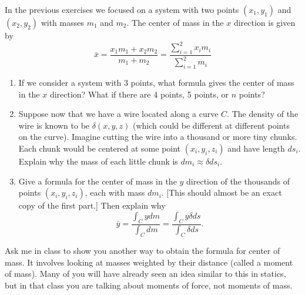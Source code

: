 \begin{problem}\label{center of mass of curve}%
%
In the previous exercises we focused on a system with two points $(x_1,y_1)$ and $(x_2,y_2)$ with masses $m_1$ and $m_2$. The center of mass in the $x$ direction is given by  
$$
\bar x = \frac{x_1m_1+x_2m_2}{m_1+m_2} = \frac{\sum_{i=1}^2x_i m_i}{\sum_{i=1}^2m_i}$$
\begin{enumerate}
\item If we consider a system with 3 points, what formula gives the center of mass in the $x$ direction? What if there are 4 points, 5 points, or $n$ points?  
 \item Suppose now that we have a wire located along a curve $C$. The density of the wire is known to be $\delta(x,y,z)$ (which could be different at different points on the curve).  Imagine cutting the wire into a thousand or more tiny chunks.  Each chunk would be centered at some point $(x_i,y_i,z_i)$ and have length $ds_i$. Explain why the mass of each little chunk is $dm_i\approx\delta ds_i$. 
 \item Give a formula for the center of mass in the $y$ direction of the thousands of points $(x_i,y_i,z_i)$, each with mass $dm_i$. [This should almost be an exact copy of the first part.] 
 Then explain why $$\bar y = \frac{\int_C y dm}{\int_C dm}=\frac{\int_C y \delta ds}{\int_C \delta ds}.$$
\end{enumerate}
\end{problem}

Ask me in class to show you another way to obtain the formula for center of mass. It involves looking at masses weighted by their distance (called a moment of mass).  Many of you will have already seen an idea similar to this in statics, but in that class you are talking about moments of force, not moments of mass. \\

